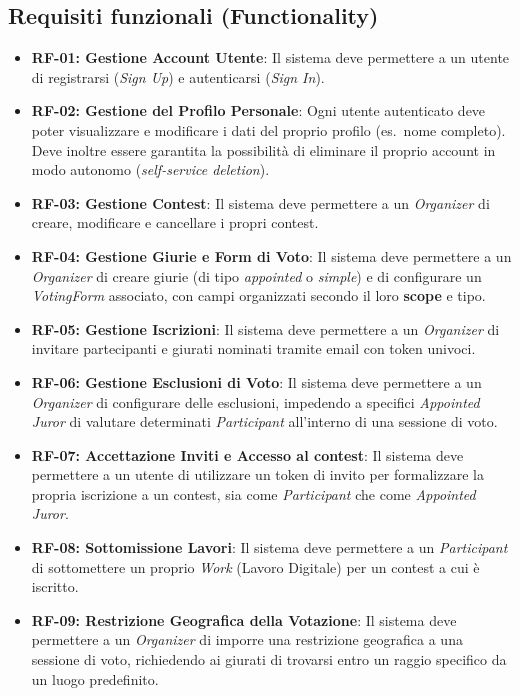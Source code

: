 \subsection{Requisiti funzionali (Functionality)}\label{subsec:requisiti-funzionali}
\begin{itemize}
    \item \textbf{RF-01: Gestione Account Utente}: Il sistema deve permettere a un utente di registrarsi (\emph{Sign Up}) e autenticarsi (\emph{Sign In}).
    \item \textbf{RF-02: Gestione del Profilo Personale}: Ogni utente autenticato deve poter visualizzare e modificare i dati del proprio profilo (es.\ nome completo).
    Deve inoltre essere garantita la possibilità di eliminare il proprio account in modo autonomo (\emph{self-service deletion}).
    \item \textbf{RF-03: Gestione Contest}: Il sistema deve permettere a un \emph{Organizer} di creare, modificare e cancellare i propri contest.
    \item \textbf{RF-04: Gestione Giurie e Form di Voto}: Il sistema deve permettere a un \emph{Organizer} di creare giurie (di tipo \emph{appointed} o \emph{simple}) e di configurare un \emph{VotingForm} associato, con campi organizzati secondo il loro \textbf{scope} e tipo.
    \item \textbf{RF-05: Gestione Iscrizioni}: Il sistema deve permettere a un \emph{Organizer} di invitare partecipanti e giurati nominati tramite email con token univoci.
    \item \textbf{RF-06: Gestione Esclusioni di Voto}: Il sistema deve permettere a un \emph{Organizer} di configurare delle esclusioni, impedendo a specifici \emph{Appointed Juror} di valutare determinati \emph{Participant} all'interno di una sessione di voto.
    \item \textbf{RF-07: Accettazione Inviti e Accesso al contest}: Il sistema deve permettere a un utente di utilizzare un token di invito per formalizzare la propria iscrizione a un contest, sia come \emph{Participant} che come \emph{Appointed Juror}.
    \item \textbf{RF-08: Sottomissione Lavori}: Il sistema deve permettere a un \emph{Participant} di sottomettere un proprio \emph{Work} (Lavoro Digitale) per un contest a cui è iscritto.
    \item \textbf{RF-09: Restrizione Geografica della Votazione}: Il sistema deve permettere a un \emph{Organizer} di imporre una restrizione geografica a una sessione di voto, richiedendo ai giurati di trovarsi entro un raggio specifico da un luogo predefinito.

\end{itemize}
